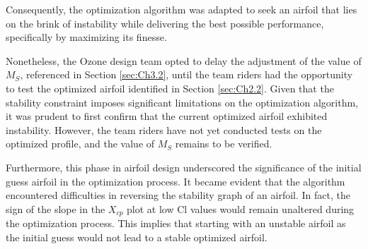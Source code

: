 Consequently, the optimization algorithm was adapted to seek an airfoil that lies on the brink of instability while delivering the best possible performance, specifically by maximizing its finesse.

Nonetheless, the Ozone design team opted to delay the adjustment of the value of $M_{S}$, referenced in Section \ref{sec:Ch3.2}, until the team riders had the opportunity to test the optimized airfoil identified in Section \ref{sec:Ch2.2}. Given that the stability constraint imposes significant limitations on the optimization algorithm, it was prudent to first confirm that the current optimized airfoil exhibited instability. However, the team riders have not yet conducted tests on the optimized profile, and the value of $M_{S}$ remains to be verified.

Furthermore, this phase in airfoil design underscored the significance of the initial guess airfoil in the optimization process. It became evident that the algorithm encountered difficulties in reversing the stability graph of an airfoil. In fact, the sign of the slope in the $X_{cp}$ plot at low Cl values would remain unaltered during the optimization process. This implies that starting with an unstable airfoil as the initial guess would not lead to a stable optimized airfoil.